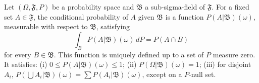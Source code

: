 Let $(\Omega, \mathfrak{F}, P)$ be a probability space and $\mathfrak{B}$ a sub-sigma-field of $\mathfrak{F}$. For a fixed set $A \in \mathfrak{F}$, the conditional probability of $A$ given $\mathfrak{B}$ is a function $P(A|\mathfrak{B})(\omega)$, measurable with respect to $\mathfrak{B}$, satisfying
$$\int_B P(A|\mathfrak{B})(\omega) \, dP = P(A \cap B)$$
for every $B \in \mathfrak{B}$. This function is uniquely defined up to a set of $P$ measure zero. It satisfies: (i) $0 \leq P(A|\mathfrak{B})(\omega) \leq 1$; (ii) $P(\Omega|\mathfrak{B})(\omega) = 1$; (iii) for disjoint $A_i$, $P(\bigcup A_i|\mathfrak{B})(\omega) = \sum P(A_i|\mathfrak{B})(\omega)$, except on a $P$-null set.

